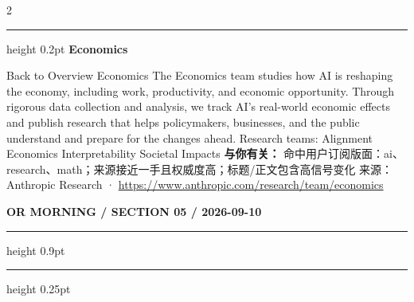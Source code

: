 \documentclass[10.5pt]{ctexart}
\begin{document}
\begin{multicols}{2}
\hrule height 0.2pt
\vspace{2mm}
{\large\bfseries Economics}\par
Back to Overview Economics The Economics team studies how AI is reshaping the economy, including work, productivity, and economic opportunity. Through rigorous data collection and analysis, we track AI's real-world economic effects and publish research that helps policymakers, businesses, and the public understand and prepare for the changes ahead. Research teams: Alignment Economics Interpretability Societal Impacts
\textbf{与你有关：} 命中用户订阅版面：ai、research、math；来源接近一手且权威度高；标题/正文包含高信号变化
{\footnotesize\color{ormuted} 来源：Anthropic Research · \url{https://www.anthropic.com/research/team/economics}}
\end{multicols}
\newpage
{\small\bfseries OR MORNING / SECTION 05 / 2026-09-10}
\vspace{2mm}
\hrule height 0.9pt
\vspace{1.5mm}
\hrule height 0.25pt
\vspace{4mm}
\end{document}
